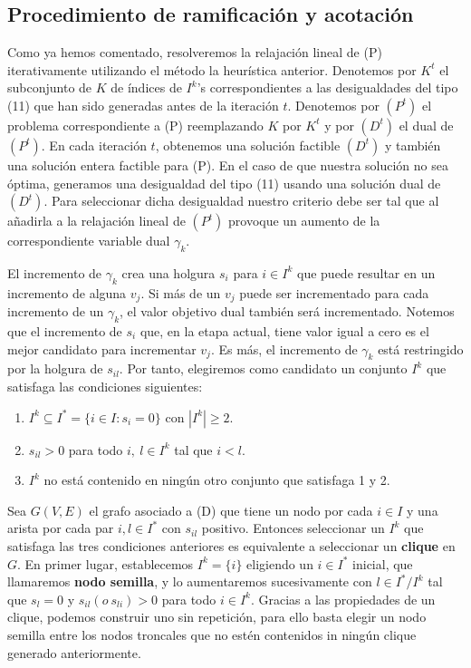 \documentclass[twoside,12pt]{article}
\begin{document}
\subsection{Procedimiento de ramificación y acotación}
Como ya hemos comentado, resolveremos la relajación lineal de (P) iterativamente utilizando el método la heurística anterior. Denotemos por $K^t$ el subconjunto de $K$ de índices de $I^k$'s correspondientes a las desigualdades del tipo (11) que han sido generadas antes de la iteración $t$. Denotemos por $(P^t)$ el problema correspondiente a (P) reemplazando $K$ por $K^t$ y por $(D^t)$ el dual de $(P^t)$. En cada iteración $t$, obtenemos una solución factible $(D^t)$ y también una solución entera factible para (P). En el caso de que nuestra solución no sea óptima, generamos una desigualdad del tipo (11) usando una solución dual de $(D^t)$. Para seleccionar dicha desigualdad nuestro criterio debe ser tal que al añadirla a la relajación lineal de $(P^t)$ provoque un aumento de la correspondiente variable dual $\gamma_k$. 

El incremento de $\gamma_k$ crea una holgura $s_i$ para $i\in I^k$ que puede resultar en un incremento de alguna $v_j$. Si más de un $v_{j}$ puede ser incrementado para cada incremento de un $\gamma_{k}$, el valor objetivo dual también será incrementado. Notemos que el incremento de $s_{i}$ que, en la etapa actual, tiene valor igual a cero es el mejor candidato para incrementar $v_{j}$. Es más, el incremento de $\gamma_{k}$ está restringido por la holgura de $s_{il}$. Por tanto, elegiremos como candidato un conjunto $I^{k}$ que satisfaga las condiciones siguientes:
\begin{enumerate}[1.]
    \item $I^{k}\subseteq I^{*}=\{i\in I:s_{i}=0\}$ con $|I^{k}|\geq 2$.
    \item $s_{il}>0$ para todo $i, \ l\in I^{k}$ tal que $i<l$.
    \item $I^{k}$ no está contenido en ningún otro conjunto que satisfaga 1 y 2.
\end{enumerate}

Sea $G(V,E)$ el grafo asociado a (D) que tiene un nodo por cada $i\in I$ y una arista por cada par $i,l \in I^{*}$ con $s_{il}$ positivo. Entonces seleccionar un $I^{k}$ que satisfaga las tres condiciones anteriores es equivalente a seleccionar un \textbf{clique} en $G$. En primer lugar, establecemos $I^{k}=\{i\}$ eligiendo un $i\in I^{*}$ inicial, que llamaremos \textbf{nodo semilla}, y lo aumentaremos sucesivamente con $l\in I^{*}/I^{k}$ tal que $s_{l}=0$ y $s_{il}(o\ s_{li})>0$ para todo $i\in I^{k}$. Gracias a las propiedades de un clique, podemos construir uno sin repetición, para ello basta elegir un nodo semilla entre los nodos troncales que no estén contenidos in ningún clique generado anteriormente.\\
\end{document}
